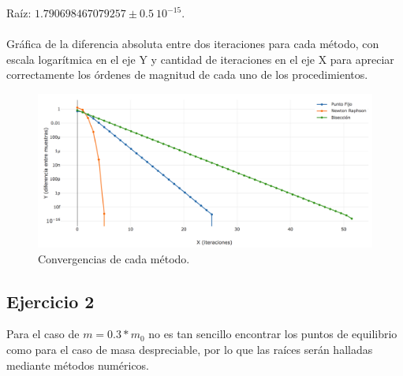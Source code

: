 \documentclass[10pt,a4paper]{article}
\begin{document}
\begin{table}[H]
\makegapedcells
\centering
{}
\caption{Newton-Raphson Semilla: 1}
\end{table}

Raíz: $1.790698467079257 \pm 0.5\:10^{-15}$.
\\
\\
Gráfica de la diferencia absoluta entre dos iteraciones para cada método, con escala logarítmica en el eje Y y cantidad de iteraciones en el eje X para apreciar correctamente los órdenes de magnitud de cada uno de los procedimientos.

\begin{figure}[H]
\centering
\includegraphics[width=15cm]{ej1.png}
\caption{Convergencias de cada método.}
\end{figure}

\subsection{Ejercicio 2}
 Para el caso de $m=0.3*m_{0}$ no es tan sencillo encontrar los puntos de equilibrio como para el caso de masa despreciable, por lo que las raíces serán halladas mediante métodos numéricos.\\
\end{document}
